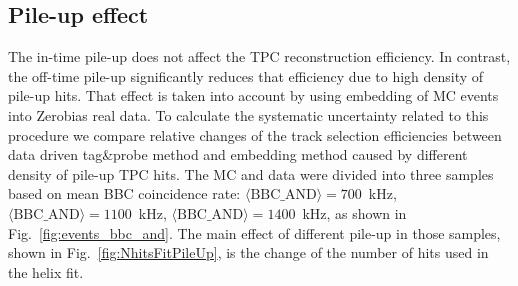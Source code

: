 \subsection{Pile-up effect}\label{subsec:TpcEffSystPileUp}
The in-time pile-up does not affect the TPC reconstruction efficiency. In contrast, the off-time pile-up significantly reduces that efficiency due to high density of  pile-up hits. That effect is taken into account by using embedding of MC events into Zerobias real data. To calculate the systematic uncertainty related to this procedure we compare relative changes of the track selection efficiencies 
between  data driven tag\&probe method and embedding method caused by different density of pile-up TPC hits. The MC  and data were divided into three samples based on mean BBC coincidence rate: \mbox{$\langle\text{BBC\_AND}\rangle=700$~kHz}, \mbox{$\langle\text{BBC\_AND}\rangle=1100$~kHz}, \mbox{$\langle\text{BBC\_AND}\rangle=1400$~kHz}, as shown in Fig.~\ref{fig:events_bbc_and}. The main effect of different pile-up in those samples, shown in Fig.~\ref{fig:NhitsFitPileUp}, is the change of the number of hits used in the helix fit.\vspace{-10pt}


